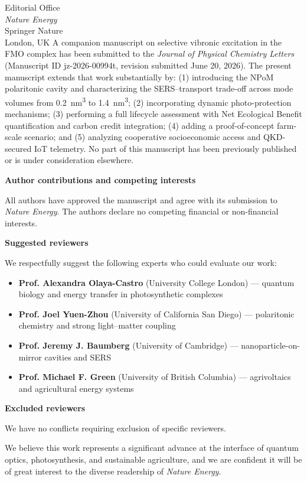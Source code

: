 \documentclass[12pt]{letter}
\begin{document}
\begin{letter}{Editorial Office\\
\textit{Nature Energy}\\
Springer Nature\\
London, UK}
A companion manuscript on selective vibronic excitation in the FMO complex has been submitted to the \textit{Journal of Physical Chemistry Letters} (Manuscript ID jz-2026-00994t, revision submitted June 20, 2026). The present manuscript extends that work substantially by: (1) introducing the NPoM polaritonic cavity and characterizing the SERS--transport trade-off across mode volumes from \SI{0.2}{\nm\cubed} to \SI{1.4}{\nm\cubed}; (2) incorporating dynamic photo-protection mechanisms; (3) performing a full lifecycle assessment with Net Ecological Benefit quantification and carbon credit integration; (4) adding a proof-of-concept farm-scale scenario; and (5) analyzing cooperative socioeconomic access and QKD-secured IoT telemetry. No part of this manuscript has been previously published or is under consideration elsewhere.

\noindent\textbf{Author contributions and competing interests}

All authors have approved the manuscript and agree with its submission to \textit{Nature Energy}. The authors declare no competing financial or non-financial interests.

\noindent\textbf{Suggested reviewers}

We respectfully suggest the following experts who could evaluate our work:

\begin{itemize}
\item \textbf{Prof. Alexandra Olaya-Castro} (University College London) --- quantum biology and energy transfer in photosynthetic complexes
\item \textbf{Prof. Joel Yuen-Zhou} (University of California San Diego) --- polaritonic chemistry and strong light--matter coupling
\item \textbf{Prof. Jeremy J. Baumberg} (University of Cambridge) --- nanoparticle-on-mirror cavities and SERS
\item \textbf{Prof. Michael F. Green} (University of British Columbia) --- agrivoltaics and agricultural energy systems
\end{itemize}

\noindent\textbf{Excluded reviewers}

We have no conflicts requiring exclusion of specific reviewers.

\vspace{2em}

We believe this work represents a significant advance at the interface of quantum optics, photosynthesis, and sustainable agriculture, and we are confident it will be of great interest to the diverse readership of \textit{Nature Energy}.


\end{letter}
\end{document}
